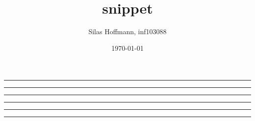 \documentclass{article}
\title{snippet}
\author{Silas Hoffmann, inf103088}
\date{\today}
\begin{document}
\begin{center}
\rule{\textwidth}{1pt}
\end{center}


\lipsum[66]

\begin{center}
\rule{0.9\textwidth}{0.3pt}
\end{center}


\lipsum[66]

\begin{center}
\rule{\textwidth}{1pt}
\end{center}

\begin{center}
\rule{\textwidth}{1pt}
\end{center}


\lipsum[66]

\begin{center}
\rule{0.9\textwidth}{0.3pt}
\end{center}


\lipsum[66]

\begin{center}
\rule{\textwidth}{1pt}
\end{center}
\end{document}
